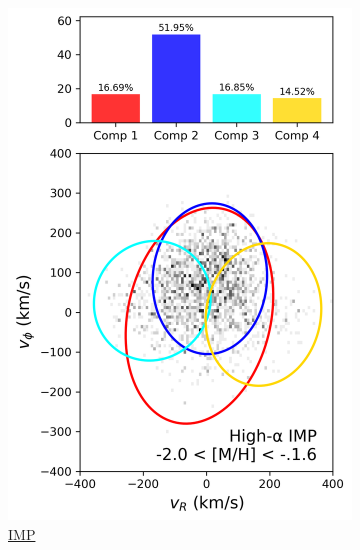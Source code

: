 \documentclass[a4paper,12pt]{article}
\begin{document}
\begin{figure}[H]
\begin{subfigure}{0.245\linewidth}
    \includegraphics[width=\linewidth]{../figures/gmm_imp_high_alpha_k4.png}
    \caption{\href{https://raw.githack.com/raunaq-rai/Disentangling-the-Milky-Way-using-GMM/main/figures/IMP\_high\_\_\_-2\%5BM\_H\%5D-1.6.html}{IMP}}
    \label{fig:imp_hi}
  \end{subfigure}\hfill
  \begin{subfigure}{0.245\linewidth}

\end{subfigure}
\end{figure}
\end{document}
